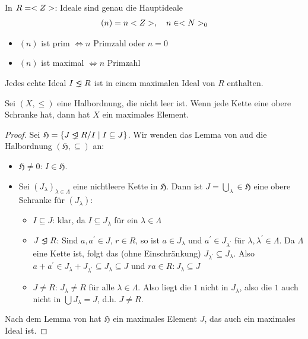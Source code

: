 \begin{example}
	In $R = <Z>$: Ideale sind genau die Hauptideale
	\begin{align}
		(n) = n<Z>,\quad n \in <N>_0\notag
	\end{align}
	\begin{itemize}
		\item $(n)$ ist prim $\Leftrightarrow n$ Primzahl oder $n = 0$
		\item $(n)$ ist maximal $\Leftrightarrow n$ Primzahl
	\end{itemize}
\end{example}

\begin{proposition}
	Jedes echte Ideal $I \properideal R$ ist in einem maximalen Ideal von $R$ enthalten.
\end{proposition}

\begin{erinnerung}
	Sei $(X,\le)$ eine Halbordnung, die nicht leer ist. Wenn jede Kette eine obere Schranke hat, dann hat $X$ ein maximales Element.
\end{erinnerung}

\begin{proof}
	Sei $\mathfrak{H} = \{ J \properideal R / I \mid I \subseteq J\}$. Wir wenden das Lemma von  aud die Halbordnung $(\mathfrak{H},\subseteq)$ an:
	\begin{itemize}
		\item $\mathfrak{H} \neq 0$: $I \in \mathfrak{H}$.
		\item Sei $(J_{\lambda})_{\lambda \in \Lambda}$ eine nichtleere Kette in $\mathfrak{H}$. Dann ist $J = \bigcup_{\lambda} \in \mathfrak{H}$ eine obere Schranke für $(J_{\lambda})$:
		\begin{itemize}
			\item $I \subseteq J$: klar, da $I \subseteq J_{\lambda}$ für ein $\lambda \in \Lambda$
			\item $J \properideal R$: Sind $a,a^' \in J$, $r \in R$, so ist $a \in J_{\lambda}$ und $a^' \in J_{\lambda^'}$ für $\lambda, \lambda^' \in \Lambda$. Da $\Lambda$ eine Kette ist, folgt das (ohne Einschränkung) $J_{\lambda^'} \subseteq J_{\lambda}$. Also $a+a^' \in J_{\lambda} + J_{\lambda^'} \subseteq J_{\lambda} \subseteq J$ und $ra \in R: J_{\lambda} \subseteq J$
			\item $J \neq R$: $J_{\lambda} \neq R$ für alle $\lambda \in \Lambda$. Also liegt die $1$ nicht in $J_{\lambda}$, also die $1$ auch nicht in $\bigcup J_{\lambda} = J$, d.h. $J \neq R.$
		\end{itemize}
	\end{itemize}
	Nach dem Lemma von  hat $\mathfrak{H}$ ein maximales Element $J$, das auch ein maximales Ideal ist.
\end{proof}

